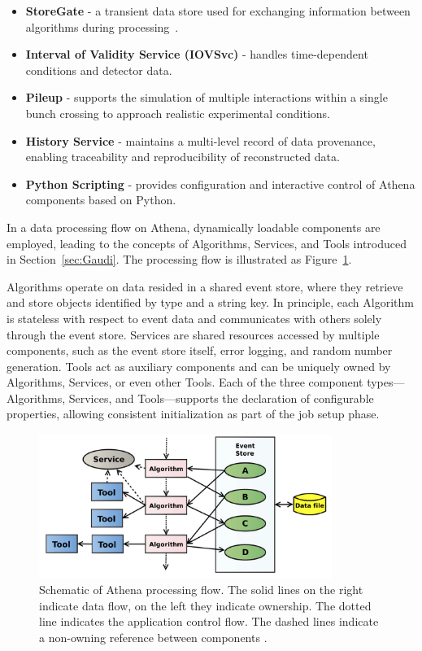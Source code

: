 \begin{itemize}
    \item \textbf{StoreGate} - a transient data store used for exchanging information between algorithms during processing~\cite{AthenaStoreGate}.
    \item \textbf{Interval of Validity Service (IOVSvc)} - handles time-dependent conditions and detector data.
    \item \textbf{Pileup} - supports the simulation of multiple interactions within a single bunch crossing to approach realistic experimental conditions.
    \item \textbf{History Service} - maintains a multi-level record of data provenance, enabling traceability and reproducibility of reconstructed data.
    \item \textbf{Python Scripting} - provides configuration and interactive control of Athena components based on Python.
\end{itemize}

In a data processing flow on Athena, dynamically loadable components are employed, leading to the concepts of Algorithms, Services, and Tools introduced in Section~\ref{sec:Gaudi}. The processing flow is illustrated as Figure~\ref{fig:Athena_process}. 

Algorithms operate on data resided in a shared event store, where they retrieve and store objects identified by type and a string key. In principle, each Algorithm is stateless with respect to event data and communicates with others solely through the event store. Services are shared resources accessed by multiple components, such as the event store itself, error logging, and random number generation. Tools act as auxiliary components and can be uniquely owned by Algorithms, Services, or even other Tools. Each of the three component types—Algorithms, Services, and Tools—supports the declaration of configurable properties, allowing consistent initialization as part of the job setup phase.

\begin{figure}[htbp]
  \centering
  \includegraphics[width=0.85\textwidth]{figs/chapter3/Athena_process.png}
  \caption{Schematic of Athena processing flow. The solid lines on the right indicate data flow, on the left they indicate ownership. The dotted line indicates the application control flow. The dashed lines indicate a non-owning reference between components \cite{ATLAScomputing2025}.}
  \label{fig:Athena_process}
\end{figure}



